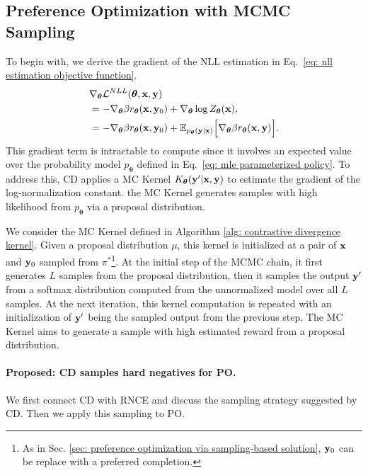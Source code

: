 \subsection{Preference Optimization with MCMC Sampling}
\label{sec: mcmc preference optimization}
To begin with,
we derive the gradient of the NLL estimation in Eq.~\eqref{eq: nll estimation objective function}.
\begin{align}
\label{eq: gradient of mle objective function}
& \nabla_{\boldsymbol\theta} \mathcal{L}^{NLL} (\boldsymbol\theta, \mathbf{x}, \mathbf{y})
\\ \nonumber
& =
- \nabla_{\boldsymbol\theta} 
\beta
r_{\boldsymbol\theta}(\mathbf{x}, \mathbf{y}_0)
+
\nabla_{\boldsymbol\theta} \log Z_{\boldsymbol\theta}(\mathbf{x}),
\\ \nonumber
& =
- \nabla_{\boldsymbol\theta} 
\beta
r_{\boldsymbol\theta}(\mathbf{x}, \mathbf{y}_0)
+
\mathbb{E}_{p_{\boldsymbol{\theta}}(\mathbf{y} | \mathbf{x})}
\Big[
\nabla_{\boldsymbol\theta} 
\beta
r_{\boldsymbol\theta}(\mathbf{x}, \mathbf{y})
\Big].
\end{align}
This gradient term is intractable to compute since it involves an expected value over the probability model $p_{\boldsymbol\theta}$ defined in Eq.~\eqref{eq: mle parameterized policy}.
To address this,
CD applies a MC Kernel $K_{\boldsymbol\theta}(\mathbf{y}' | \mathbf{x}, \mathbf{y})$ to estimate the gradient of the log-normalization constant.
the MC Kernel generates samples with high likelihood from $p_{\boldsymbol\theta}$ via a proposal distribution.

We consider the MC Kernel defined in Algorithm \ref{alg: contrastive divergence kernel}.
Given a proposal distribution $\mu$,
this kernel is initialized at a pair of $\mathbf{x}$ and $\mathbf{y}_0$ sampled from $\pi^{\ast}$\footnote{As in Sec. \ref{sec: preference optimization via sampling-based solution}, $\mathbf{y}_0$ can be replace with a preferred completion.}.
At the initial step of the MCMC chain,
it first generates $L$ samples from the proposal distribution,
then it samples the output $\mathbf{y}'$ from a softmax distribution computed from the unnormalized model over all $L$ samples.
At the next iteration,
this kernel computation is repeated with an initialization of $\mathbf{y}'$ being the sampled output from the previous step.
The MC Kernel aims to generate a sample with high estimated reward from a proposal distribution.


\paragraph{Proposed: CD samples hard negatives for PO.}
We first connect CD with RNCE and discuss the sampling strategy suggested by CD.
Then we apply this sampling to PO.

